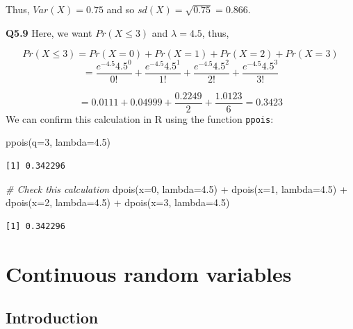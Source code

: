 \documentclass[
  oneside]{krantz}
\newenvironment{Shaded}{\begin{snugshade}}{\end{snugshade}}
\newcommand{\AttributeTok}[1]{\textcolor[rgb]{0.77,0.63,0.00}{#1}}
\newcommand{\CommentTok}[1]{\textcolor[rgb]{0.56,0.35,0.01}{\textit{#1}}}
\newcommand{\DecValTok}[1]{\textcolor[rgb]{0.00,0.00,0.81}{#1}}
\newcommand{\FloatTok}[1]{\textcolor[rgb]{0.00,0.00,0.81}{#1}}
\newcommand{\FunctionTok}[1]{\textcolor[rgb]{0.00,0.00,0.00}{#1}}
\newcommand{\NormalTok}[1]{#1}
\newcommand{\SpecialCharTok}[1]{\textcolor[rgb]{0.00,0.00,0.00}{#1}}
\begin{document}
Thus, \(Var(X)=0.75\) and so \(sd(X)=\sqrt{0.75}=0.866\).

\textbf{Q5.9} Here, we want \(Pr(X \le 3)\) and \(\lambda=4.5\), thus,

\[Pr(X\le 3) = Pr(X=0) + Pr(X=1) + Pr(X=2) + Pr(X=3) \]
\[ = \frac{e^{-4.5}4.5^0}{0!} + \frac{e^{-4.5}4.5^1}{1!} + \frac{e^{-4.5}4.5^2}{2!} + \frac{e^{-4.5}4.5^3}{3!}\]

\[ = 0.0111 + 0.04999 + \frac{0.2249}{2} + \frac{1.0123}{6} = 0.3423\]
We can confirm this calculation in R using the function \texttt{ppois}:

\begin{Shaded}
\begin{Highlighting}[]
\FunctionTok{ppois}\NormalTok{(}\AttributeTok{q=}\DecValTok{3}\NormalTok{, }\AttributeTok{lambda=}\FloatTok{4.5}\NormalTok{)}
\end{Highlighting}
\end{Shaded}

\begin{verbatim}
[1] 0.342296
\end{verbatim}

\begin{Shaded}
\begin{Highlighting}[]
\CommentTok{\# Check this calculation}
\FunctionTok{dpois}\NormalTok{(}\AttributeTok{x=}\DecValTok{0}\NormalTok{, }\AttributeTok{lambda=}\FloatTok{4.5}\NormalTok{) }\SpecialCharTok{+} \FunctionTok{dpois}\NormalTok{(}\AttributeTok{x=}\DecValTok{1}\NormalTok{, }\AttributeTok{lambda=}\FloatTok{4.5}\NormalTok{) }\SpecialCharTok{+} \FunctionTok{dpois}\NormalTok{(}\AttributeTok{x=}\DecValTok{2}\NormalTok{, }\AttributeTok{lambda=}\FloatTok{4.5}\NormalTok{) }\SpecialCharTok{+} \FunctionTok{dpois}\NormalTok{(}\AttributeTok{x=}\DecValTok{3}\NormalTok{, }\AttributeTok{lambda=}\FloatTok{4.5}\NormalTok{)}
\end{Highlighting}
\end{Shaded}

\begin{verbatim}
[1] 0.342296
\end{verbatim}

\hypertarget{contrv}{%
\chapter{Continuous random variables}\label{contrv}}

\hypertarget{INTcontrv}{%
\section{Introduction}\label{INTcontrv}}
\end{document}
